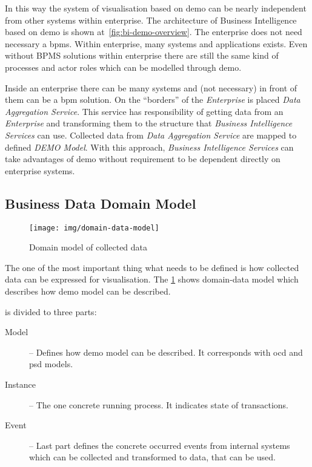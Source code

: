 In this way the system of visualisation based on \gls{demo} can be nearly independent from other systems within enterprise. The architecture of Business Intelligence based on \gls{demo} is shown at~\cref{fig:bi-demo-overview}. The enterprise does not need necessary a \gls{bpms}. Within enterprise, many systems and applications exists. Even without BPMS solutions within enterprise there are still the same kind of processes and actor roles which can be modelled through \gls{demo}.

Inside an enterprise there can be many systems and (not necessary) in front of them can be a \gls{bpm} solution. On the ``borders'' of the \textit{Enterprise} is placed \textit{Data Aggregation Service}. This service has responsibility of getting data from an \textit{Enterprise} and transforming them to the structure that \textit{Business Intelligence Services} can use. Collected data from \textit{Data Aggregation Service} are mapped to defined \textit{DEMO Model}.
With this approach, \textit{Business Intelligence Services} can take advantages of \gls{demo} without requirement to be dependent directly on enterprise systems.
\subsection{Business Data Domain Model}
\begin{figure}[ht!]
  \centering
  \texttt{[image: img/domain-data-model]}
  \caption{Domain model of collected data}
  \label{fig:domain-data-model}
\end{figure}    

The one of the most important thing what needs to be defined is how collected data can be expressed for visualisation. The \cref{fig:domain-data-model} shows domain-data model which describes how \gls{demo} model can be described.  

 is divided to three parts:
\begin{description}
\item[Model] -- Defines how \gls{demo} model can be described. It corresponds with \gls{ocd} and \gls{psd} models.
\item[Instance] -- The one concrete running process. It indicates state of transactions. 
\item[Event] -- Last part defines the concrete occurred events from internal systems which can be collected and transformed to data, that can be used. 
\end{description}

